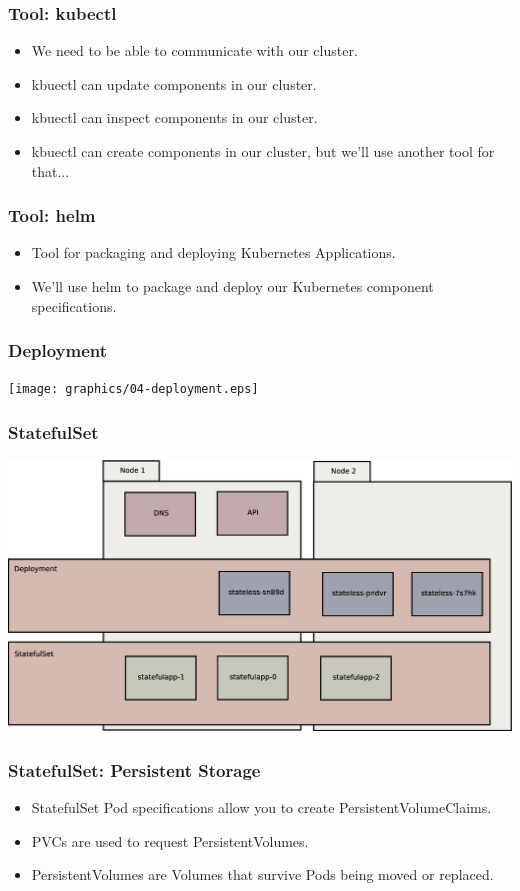 \documentclass{beamer}
\begin{document}
\begin{frame}
\frametitle{Tool: kubectl\footnotemark}
\begin{itemize}
\item We need to be able to communicate with our cluster.
\item kbuectl can update components in our cluster.
\item kbuectl can inspect components in our cluster.
\item kbuectl can create components in our cluster, but we'll use another tool for that...
\end{itemize}
\end{frame}

\begin{frame}
\frametitle{Tool: helm\footnotemark}
\begin{itemize}
    \item Tool for packaging and deploying Kubernetes Applications.
    \item We'll use helm to package and deploy our Kubernetes component specifications.
\end{itemize}
\end{frame}

\begin{frame}
    \frametitle{Deployment}
    \texttt{[image: graphics/04-deployment.eps]}
\end{frame}

\begin{frame}
    \frametitle{StatefulSet}
    \includegraphics[width=\textwidth,height=0.85\textheight,keepaspectratio]{graphics/05-statefulSet.eps}
\end{frame}

\begin{frame}
    \frametitle{StatefulSet: Persistent Storage}
    \begin{itemize}
        \item StatefulSet Pod specifications allow you to create PersistentVolumeClaims.
        \item PVCs are used to request PersistentVolumes.
        \item PersistentVolumes are Volumes that survive Pods being moved or replaced.
    \end{itemize}
\end{frame}
\end{document}
